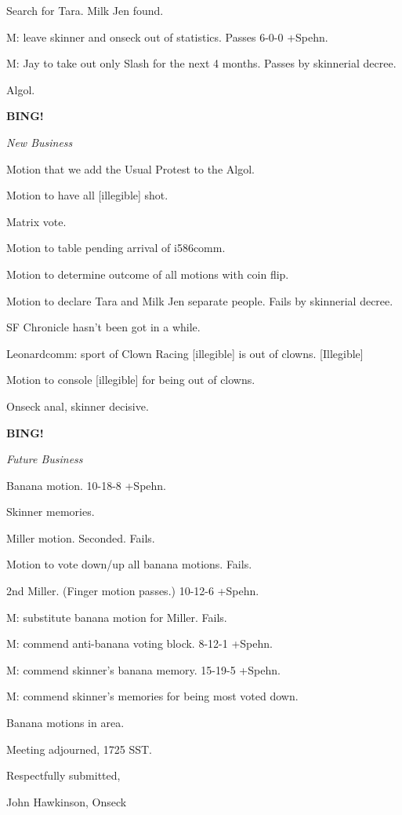 \documentclass[12pt]{article}
\newcommand{\bing}{{\bf BING!} }
\newcommand{\goto}[1]{\bing \vskip 12pt \centerline{{\em{#1}}}}
\begin{document}
Search for Tara. Milk Jen found.

M: leave skinner and onseck out of statistics. Passes 6-0-0 +Spehn.

M: Jay to take out only Slash for the next 4 months. Passes by skinnerial decree.

Algol.

\goto{New Business}

Motion that we add the Usual Protest to the Algol.

Motion to have all [illegible] shot.

Matrix vote.

Motion to table pending arrival of i586comm.

Motion to determine outcome of all motions with coin flip.

Motion to declare Tara and Milk Jen separate people. Fails by skinnerial decree.

SF Chronicle hasn't been got in a while.

Leonardcomm: sport of Clown Racing [illegible] is out of clowns. [Illegible]

Motion to console [illegible] for being out of clowns.

Onseck anal, skinner decisive.

\goto{Future Business}

Banana motion. 10-18-8 +Spehn.

Skinner memories.

Miller motion. Seconded. Fails.

Motion to vote down/up all banana motions. Fails.

2nd Miller. (Finger motion passes.) 10-12-6 +Spehn.

M: substitute banana motion for Miller. Fails.

M: commend anti-banana voting block. 8-12-1 +Spehn.

M: commend skinner's banana memory. 15-19-5 +Spehn.

M: commend skinner's memories for being most voted down.

Banana motions in area.

\vspace{12pt}

\noindent
Meeting adjourned, 1725 SST.

\vspace{18pt}

\centerline{Respectfully submitted,}
\centerline{John Hawkinson, Onseck}
\end{document}
